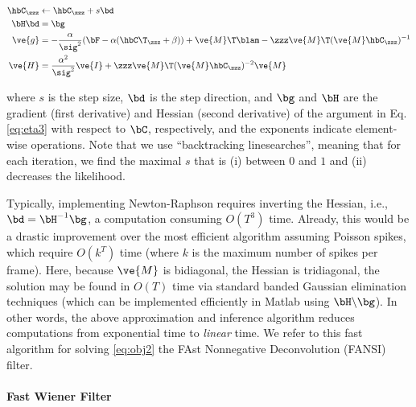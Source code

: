 
\begin{subequations} \label{eq:NR}
\begin{align}
\hbC_{\zzz} &\leftarrow \hbC_{\zzz} + s \bd \\
\bH \bd &= \bg \\
\ve{g} &= -\frac{\alpha}{\sig^2}(\bF -\alpha({\hbC\T}_{\zzz} + \beta)) + \ve{M}\T\blam - \zzz \ve{M}\T (\ve{M} \hbC_{\zzz})^{-1} \label{eq:g} \\
\ve{H} &= \frac{\alpha^2}{\sig^2} \ve{I} + \zzz \ve{M}\T (\ve{M} \hbC_{\zzz})^{-2} \ve{M} \label{eq:H}
\end{align}
\end{subequations}

\noindent where $s$ is the step size, $\bd$ is the step direction, and $\bg$ and $\bH$ are the gradient (first derivative) and Hessian (second derivative) of the argument in Eq. \eqref{eq:eta3} with respect to $\bC$, respectively, and the exponents indicate element-wise operations. Note that we use ``backtracking linesearches'', meaning that for each iteration, we find the maximal $s$ that is (i) between $0$ and $1$ and (ii) decreases the likelihood.

Typically, implementing Newton-Raphson requires inverting the Hessian, i.e., $\bd = \bH^{-1} \bg$, a computation consuming $O(T^3)$ time. Already, this would be a drastic improvement over the most efficient algorithm assuming Poisson spikes, which require $O(k^T)$ time (where $k$ is the maximum number of spikes per frame).  Here, because $\ve{M}$ is bidiagonal, the Hessian is tridiagonal, the solution may be found in $O(T)$ time via standard banded Gaussian elimination techniques (which can be implemented efficiently in Matlab using $\bH \backslash \bg$). In other words, the above approximation and inference algorithm reduces computations from exponential time to \emph{linear} time. We refer to this fast algorithm for solving \eqref{eq:obj2} the FAst Nonnegative Deconvolution (FANSI) filter. 


\paragraph{Fast Wiener Filter}

